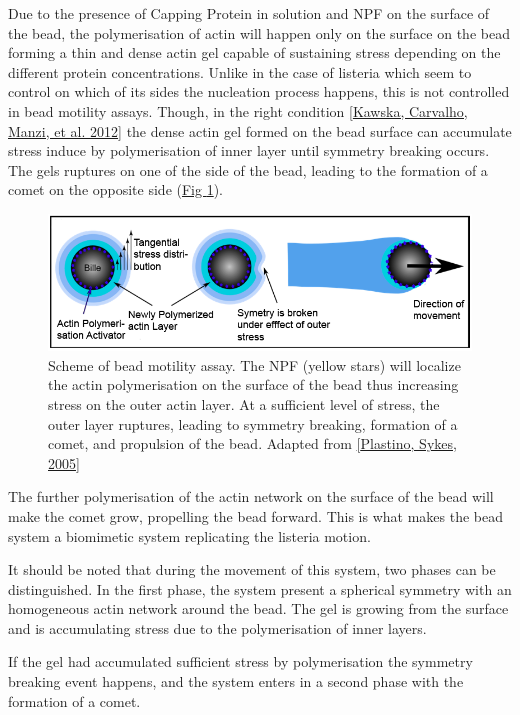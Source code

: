 \documentclass[A4paperpaper,11pt,english]{sphinxmanual}
\begin{document}
Due to the presence of Capping Protein in solution and NPF on the surface of
the bead, the polymerisation of actin will happen only on the surface on the
bead forming a thin and dense actin gel capable of sustaining stress depending
on the different protein concentrations. Unlike in the case of listeria which
seem to control on which of its sides the nucleation process happens, this is not
controlled in bead motility assays. Though, in the right condition
{\hyperref[index-latex:kawska2012]{{[}Kawska, Carvalho, Manzi,  et al.  2012{]}}} the dense actin gel formed on the bead surface can
accumulate stress induce by polymerisation of inner layer until symmetry
breaking occurs. The gels ruptures on one of the side of the bead, leading to
the formation of a comet on the opposite side (\hyperref[index-latex:fig-bead-motility]{Fig  \ref*{index-latex:fig-bead-motility}}).
\begin{figure}[htbp]
\centering
\capstart

\includegraphics[width=0.600\linewidth]{Plastino-Sykes-2005.png}
\caption{Scheme of bead motility assay. The NPF (yellow stars) will localize the
actin polymerisation on the surface of the bead thus increasing stress on
the outer actin layer. At a sufficient level of stress, the outer layer
ruptures, leading to symmetry breaking, formation of a comet, and
propulsion of the bead. Adapted from {\hyperref[index-latex:plastino2005]{{[}Plastino, Sykes,  2005{]}}}}\label{index-latex:fig-bead-motility}\end{figure}

The further polymerisation of the actin network on the surface of the bead will
make the comet grow, propelling the bead forward. This is what makes the bead
system a biomimetic system replicating the listeria motion.

It should be noted that during the movement of this system, two phases can be
distinguished. In the first phase, the system present a spherical symmetry with
an homogeneous actin  network around the bead. The gel is growing from the
surface and is accumulating stress due to the polymerisation of inner layers.

If the gel had accumulated sufficient stress by polymerisation  the symmetry breaking event happens, and the system enters in
a second phase with the formation of a comet.
\end{document}

